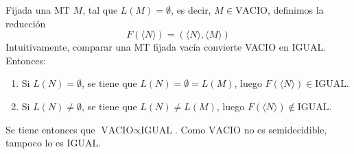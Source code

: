 \begin{ejercicio}
\begin{itemize}
        Fijada una MT $M$, tal que $L(M) = \emptyset$, es decir, $M \in \text{VACIO}$, definimos la reducción 
        $$F(\langle N \rangle) = (\langle N \rangle, \langle M \rangle)$$
        Intuitivamente, comparar una MT fijada vacía convierte VACIO en IGUAL.
        Entonces:
        \begin{enumerate}
            \item Si $L(N) = \emptyset$, se tiene que $L(N) = \emptyset = L(M)$, luego $F(\langle N \rangle) \in \text{IGUAL}$.
            \item Si $L(N) \neq \emptyset$, se tiene que $L(N) \neq L(M)$, luego $F(\langle N \rangle) \notin \text{IGUAL}$.
        \end{enumerate}
        Se tiene entonces que $\text{VACIO} \propto \text{IGUAL}$. Como $\text{VACIO}$ no es semidecidible, tampoco lo es $\text{IGUAL}$.
    \end{itemize}
\end{ejercicio}




